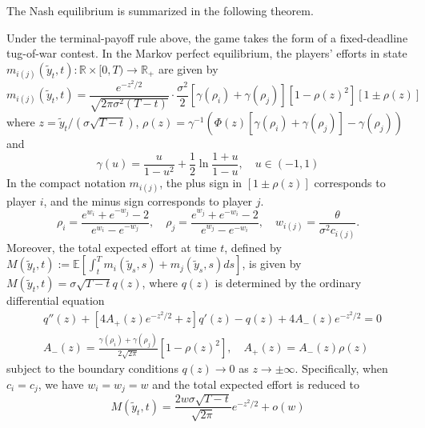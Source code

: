 \documentclass[mnsc]{informs3}
\begin{document}
The Nash equilibrium is summarized in the following theorem.

\begin{theorem}
Under the terminal-payoff rule above, the game takes the form of a fixed-deadline tug-of-war contest.
In the Markov perfect equilibrium, the players’ efforts in state $m_{i(j)}(\tilde{y}_t, t) :\mathbb{R}\times[0, T)\to\mathbb{R}_+$ are given by
\begin{equation}\label{eq-equilibrium-effort}
m_{i(j)}(\tilde{y}_t, t) = \frac{e^{-z^2/2}}{\sqrt{2\pi\sigma^2(T-t)}}\cdot \frac{\sigma^2}{2}\left[\gamma(\rho_{i}) + \gamma(\rho_{j})\right]\left[1-\rho(z)^2\right]\left[1 \pm \rho(z)\right]
\end{equation}
where $z = \tilde{y}_t / (\sigma\sqrt{T-t})$, $\rho(z) = \gamma^{-1}\left(\Phi(z)\left[\gamma(\rho_{i})+\gamma(\rho_{j})\right]-\gamma(\rho_{j})\right)$ and
\begin{equation}\label{eq-gamma}
\gamma(u) = \frac{u}{1-u^2} + \frac{1}{2}\ln\frac{1+u}{1-u},\quad u\in(-1,1)
\end{equation}
In the compact notation $m_{i(j)}$, the plus sign in $[1\pm\rho(z)]$ corresponds to player $i$, and the minus sign corresponds to player $j$.
\begin{equation*}
\rho_{i} = \frac{e^{w_{i}}+e^{-w_{j}}-2}{e^{w_{i}}-e^{-w_{j}}},
\quad
\rho_{j} = \frac{e^{w_{j}}+e^{-w_{i}}-2}{e^{w_{j}}-e^{-w_{i}}},
\quad
w_{i(j)} = \frac{\theta}{\sigma^2 c_{i(j)}}.
\end{equation*}
Moreover, the total expected effort at time $t$, defined by $M(\tilde{y}_t, t) := \mathbb{E}\left[\int^T_t m_i(\tilde{y}_s, s) + m_j(\tilde{y}_s, s)ds\right]$, is given by $M(\tilde{y}_t, t) = \sigma \sqrt{T-t} q(z)$, where $q(z)$ is determined by the ordinary differential equation
\begin{equation}
\begin{aligned}
&q''(z) + \left[4A_+(z)e^{-z^2/2}+z\right]q'(z) - q(z) + 4A_-(z)e^{-z^2/2} = 0\\
&A_-(z) = \frac{\gamma(\rho_i) + \gamma(\rho_j)}{2\sqrt{2\pi}}[1 - \rho(z)^2],
\quad A_+(z) = A_-(z)\rho(z)
\end{aligned}
\end{equation}
subject to the boundary conditions $q(z)\to0$ as $z\to\pm\infty$.
Specifically, when $c_i = c_j$, we have $w_i = w_j = w$ and the total expected effort is reduced to
\begin{equation}\label{eq-totaleffort-reduced}
M(\tilde{y}_t, t) = \frac{2w\sigma\sqrt{T-t}}{\sqrt{2\pi}}e^{-z^2/2} + o(w)
\end{equation}
\end{theorem}
\end{document}
